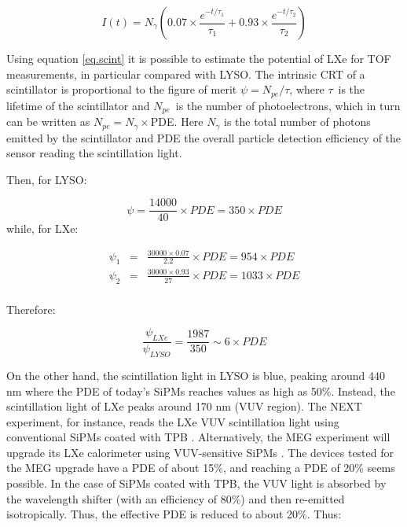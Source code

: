 \documentclass[review]{elsarticle}
\begin{document}
\begin{equation}
I(t) = N_\gamma (0.07 \times \frac{e^{-t/\tau_1}}{\tau_1} + 0.93 \times \frac{e^{-t/\tau_2}}{\tau_2})
\label{eq.scint}
\end{equation}

Using equation \ref{eq.scint} it is possible to estimate the potential of LXe for TOF measurements, in particular compared with LYSO. The intrinsic CRT of a scintillator is proportional to the figure of merit 
$\psi = N_{pe}/\tau$, where $\tau$~is the lifetime of the scintillator and $N_{pe}$~is the number of photoelectrons, which in turn can be written as $N_{pe} = N_\gamma \times $PDE. Here $N_\gamma$ is the total number of photons emitted by the scintillator and PDE the overall particle detection efficiency of the sensor reading the scintillation light. 

Then, for LYSO: 

\begin{equation}
\psi = \frac{14000}{40} \times PDE = 350 \times PDE
\label{eq.lysoScint}
\end{equation}
%
while, for LXe:

\begin{eqnarray}
\psi_1 &=& \frac{30000 \times 0.07}{2.2} \times PDE = 954 \times PDE \\
\psi_2 &=& \frac{30000 \times 0.93}{27} \times PDE = 1033 \times PDE \\
\end{eqnarray}

Therefore:

\begin{equation}
\frac{\psi_{LXe}}{\psi_{LYSO}} = \frac{1987}{350} \sim 6 \times PDE
\label{eq.ratioScint}
\end{equation}

On the other hand, the scintillation light in LYSO is blue, peaking around 440 nm where the PDE of today's SiPMs reaches values as high as 50\%. Instead, the scintillation light of LXe peaks around 170 nm (VUV region). The NEXT experiment, for instance, reads the LXe VUV scintillation light using conventional SiPMs coated with TPB \cite{Alvarez:2013gxa}. Alternatively, the MEG experiment will upgrade its LXe calorimeter using VUV-sensitive SiPMs \cite{Ogawa:2015ucj}.
The devices tested for the MEG upgrade have a PDE of about 15\%, and reaching a PDE of 20\% seems possible. In the case of SiPMs coated with TPB, the VUV light is absorbed by the wavelength shifter (with an efficiency of 80\%) and then re-emitted isotropically. Thus, the effective PDE is reduced to about 20\%. Thus:
\end{document}
